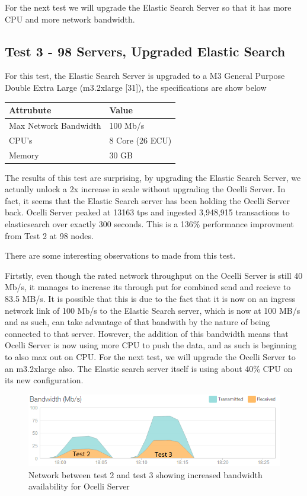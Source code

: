 \documentclass{llncs}
\begin{document}
For the next test we will upgrade the Elastic Search Server so that it has more CPU and more network bandwidth.

\subsection{Test 3 - 98 Servers, Upgraded Elastic Search}

For this test, the Elastic Search Server is upgraded to a M3 General Purpose Double Extra Large (m3.2xlarge [31]), the specifications are show below

\begin{flushleft}
    \begin{tabular}{ | l | l |}
    \hline
  Attrubute & Value  \\ \hline
Max Network Bandwidth &  100 Mb/s	\\ \hline
CPU's &  8 Core (26 ECU)	\\ \hline
Memory &  30 GB	\\ 
    \hline
    \end{tabular}
\end{flushleft}

The results of this test are surprising, by upgrading the Elastic Search Server, we actually unlock a 2x increase in scale without upgrading the Ocelli Server. In fact, it seems that the Elastic Search server has been holding the Ocelli Server back. Ocelli Server peaked at 13163 tps and ingested 3,948,915 transactions to elasticsearch over exactly 300 seconds. This is a 136\% performance improvment from Test 2 at 98 nodes.

There are some interesting observations to made from this test.

Firtstly, even though the rated network throughput on the Ocelli Server is still 40 Mb/s, it manages to increase its through put for combined send and recieve to 83.5 MB/s. It is possible that this is due to the fact that it is now on an ingress network link of 100 Mb/s to the Elastic Search server, which is now at 100 MB/s and as such, can take advantage of that bandwith by the nature of being connected to that server. However, the addition of this bandwidth means that Ocelli Server is now using more CPU to push the data, and as such is beginning to also max out on CPU. For the next test, we will upgrade the Ocelli Server to an m3.2xlarge also. The Elastic search server itself is using about 40\% CPU on its new configuration. 

\begin{figure}[h]
    \centering
    \includegraphics[scale=0.7]{app12}
    \caption{Network between test 2 and test 3 showing increased bandwidth availability for Ocelli Server}
    \label{fig:ocelli_dm}
\end{figure}
\end{document}
